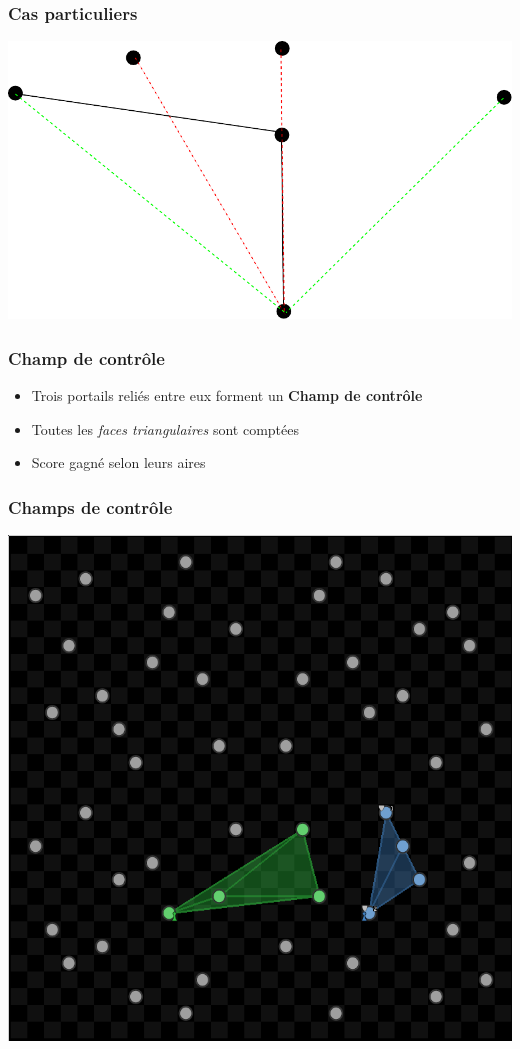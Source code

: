 \documentclass{beamer}
\begin{document}
\begin{frame}
	\frametitle{Cas particuliers}
    \begin{center}
    \includegraphics[height=0.7\textheight]{interference.pdf}
    \end{center}
\end{frame}


\begin{frame}
	\frametitle{Champ de contrôle}
    \begin{itemize}
        \item Trois portails reliés entre eux forment un \textbf{Champ de contrôle}
        \item Toutes les \emph{faces triangulaires} sont comptées
        \item Score gagné selon leurs aires
    \end{itemize}
\end{frame}

\begin{frame}
    \begin{center}
        \frametitle{Champs de contrôle}
        \includegraphics[height=0.8\textheight]{gui_triangle}
    \end{center}
\end{frame}
\end{document}
